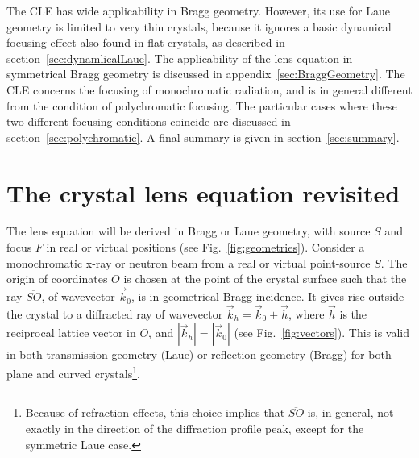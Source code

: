 \documentclass[preprint]{iucr}              %
\newcommand{\inblue}[1]{{\color{blue}#1}}
\begin{document}
The CLE has wide applicability in Bragg geometry. However, its use for Laue geometry is limited to very thin crystals, because
it ignores a basic dynamical focusing effect also found in flat crystals,
as described in section~\ref{sec:dynamlicalLaue}. 
The applicability of the lens equation in symmetrical Bragg geometry is discussed in appendix~\ref{sec:BraggGeometry}.
The CLE concerns the focusing of monochromatic radiation, and is in general different from the condition of polychromatic focusing. The particular cases where these two different focusing conditions coincide are discussed in section~\ref{sec:polychromatic}. A final summary is given in section~\ref{sec:summary}.   


\section{The crystal lens equation revisited}
\label{sec:CLE}

The lens equation will be derived in Bragg or Laue geometry, with source $S$ and focus $F$ in real or virtual positions (see Fig.~\ref{fig:geometries}). Consider a monochromatic x-ray or neutron beam from a real or virtual point-source $S$. The origin of coordinates $O$ is chosen at the point of the crystal surface such that the ray $\overline{SO}$, of wavevector  $\vec k_0$, is in \inblue{geometrical} Bragg incidence. \inblue{It gives rise outside the crystal} to a diffracted ray of wavevector $\vec k_h = \vec k_0 + \vec h$, where $\vec h$ is the reciprocal lattice vector in $O$, and \inblue{$|\vec k_h|=|\vec k_0|$} (see Fig.~\ref{fig:vectors}). This is valid in both transmission geometry (Laue) or reflection geometry (Bragg) for both plane and curved crystals\footnote{\inblue{Because of refraction effects, this choice implies that $\overline{SO}$ is, in general, not exactly in the direction of the diffraction profile peak, except for the symmetric Laue case}.}. 
\end{document}
